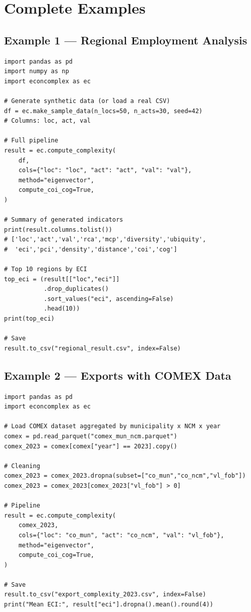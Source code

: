 \documentclass[12pt, a4paper]{article}
\begin{document}
\section{Complete Examples}

\subsection{Example 1 --- Regional Employment Analysis}

\begin{lstlisting}[caption={Complete regional employment analysis}]
import pandas as pd
import numpy as np
import econcomplex as ec

# Generate synthetic data (or load a real CSV)
df = ec.make_sample_data(n_locs=50, n_acts=30, seed=42)
# Columns: loc, act, val

# Full pipeline
result = ec.compute_complexity(
    df,
    cols={"loc": "loc", "act": "act", "val": "val"},
    method="eigenvector",
    compute_coi_cog=True,
)

# Summary of generated indicators
print(result.columns.tolist())
# ['loc','act','val','rca','mcp','diversity','ubiquity',
#  'eci','pci','density','distance','coi','cog']

# Top 10 regions by ECI
top_eci = (result[["loc","eci"]]
           .drop_duplicates()
           .sort_values("eci", ascending=False)
           .head(10))
print(top_eci)

# Save
result.to_csv("regional_result.csv", index=False)
\end{lstlisting}

\subsection{Example 2 --- Exports with COMEX Data}

\begin{lstlisting}[caption={Export analysis with COMEX/MDIC data}]
import pandas as pd
import econcomplex as ec

# Load COMEX dataset aggregated by municipality x NCM x year
comex = pd.read_parquet("comex_mun_ncm.parquet")
comex_2023 = comex[comex["year"] == 2023].copy()

# Cleaning
comex_2023 = comex_2023.dropna(subset=["co_mun","co_ncm","vl_fob"])
comex_2023 = comex_2023[comex_2023["vl_fob"] > 0]

# Pipeline
result = ec.compute_complexity(
    comex_2023,
    cols={"loc": "co_mun", "act": "co_ncm", "val": "vl_fob"},
    method="eigenvector",
    compute_coi_cog=True,
)

# Save
result.to_csv("export_complexity_2023.csv", index=False)
print("Mean ECI:", result["eci"].dropna().mean().round(4))
\end{lstlisting}
\end{document}

